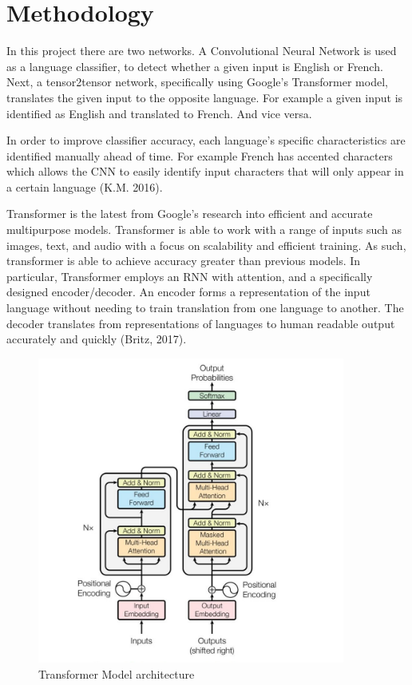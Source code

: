 \documentclass[10pt,a4paper]{article}
\begin{document}
\clearpage


\section{Methodology}

In this project there are two networks. A Convolutional Neural Network is used as a language classifier, to detect whether a given input is English or French. Next, a tensor2tensor network, specifically using Google's Transformer model, translates the given input to the opposite language. For example a given input is identified as English and translated to French. And vice versa.
  
  
In order to improve classifier accuracy, each language’s specific characteristics are identified manually ahead of time. For example French has accented characters which allows the CNN to easily identify input characters that will only appear in a certain language (K.M. 2016).
  
  
 Transformer is the latest from Google's research into efficient and accurate multipurpose models. Transformer is able to work with a range of inputs such as images, text, and audio with a focus on scalability and efficient training. As such, transformer is able to achieve accuracy greater than previous models. In particular, Transformer employs an RNN with attention, and a specifically designed encoder/decoder. An encoder forms a representation of the input language without needing to train translation from one language to another. The decoder translates from representations of languages to human readable output accurately and quickly (Britz, 2017).
   
   
\begin{figure}[H]
  \begin{center}
    \includegraphics[width=0.9\textwidth] {transformer.jpg}
    \caption{Transformer Model architecture}
  \end{center}
\end{figure}
\end{document}
